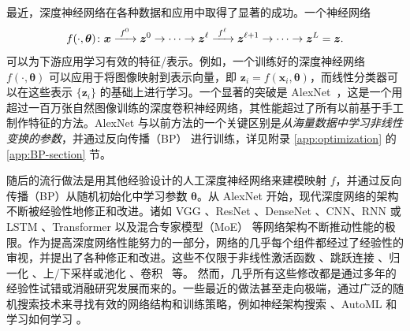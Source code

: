 \documentclass[../../book-main.tex]{subfiles}
\begin{document}
最近，深度神经网络在各种数据和应用中取得了显著的成功。一个神经网络
\begin{equation}
  f(\cdot, \bm \theta) \colon \bm{x}
  \xrightarrow{\hspace{1mm} f^0 \hspace{1mm}} \bm{z}^0 \rightarrow \cdots
  \rightarrow \bm{z}^\ell \xrightarrow{\hspace{1mm} f^\ell \hspace{1mm}}
  \bm{z}^{\ell+1} \rightarrow  \cdots \to \bm{z}^L = \bm{z}.
\end{equation}
可以为下游应用学习有效的特征/表示。例如，一个训练好的深度神经网络 $f(\cdot, \bm \theta)$ 可以应用于将图像映射到表示向量，即 $\bm{z}_i = f(\bm{x}_i,\bm \theta)$，而线性分类器可以在这些表示 $\{\bm{z}_i\}$ 的基础上进行学习。一个显著的突破是 AlexNet~\cite{krizhevsky2012imagenet}，这是一个用超过一百万张自然图像训练的深度卷积神经网络，其性能超过了所有以前基于手工制作特征的方法。AlexNet 与以前方法的一个关键区别是\textit{从海量数据中学习非线性变换的参数}，并通过反向传播（BP）\cite{Back-Prop} 进行训练，详见附录 \ref{app:optimization} 的 \ref{app:BP-section} 节。



随后的流行做法是用其他经验设计的人工深度神经网络来建模映射 $f$，并通过反向传播（BP）从随机初始化中学习参数 $\bm \theta$。从 AlexNet \cite{krizhevsky2012imagenet} 开始，现代深度网络的架构不断被经验性地修正和改进。诸如 VGG \cite{simonyan2014very}、ResNet \cite{he2016deep}、DenseNet \cite{dense-net}、CNN、RNN 或 LSTM \cite{LSTM}、Transformer \cite{vaswani2017attention} 以及混合专家模型（MoE）\cite{MoE,Fedus-2022} 等网络架构不断推动性能的极限。作为提高深度网络性能努力的一部分，网络的几乎每个组件都经过了经验性的审视，并提出了各种修正和改进。这些不仅限于非线性激活函数 \cite{maas2013rectifier,klambauer2017self,xu2015empirical,nwankpa2018activation}、跳跃连接 \cite{ronneberger2015u,he2016deep}、归一化 \cite{ioffe2015batch,ba2016layer,ulyanov2016instance,wu2018group,miyato2018spectral}、上/下采样或池化 \cite{scherer2010evaluation}、卷积~\cite{lecun1998gradient,krizhevsky2012imagenet} 等。
然而，几乎所有这些修改都是通过多年的经验性{试错}或消融研究发展而来的。一些最近的做法甚至走向极端，通过广泛的随机搜索技术来寻找有效的网络结构和训练策略，例如神经架构搜索 \cite{NAS-1,Baker2017DesigningNN}、AutoML \cite{automl} 和学习如何学习 \cite{andrychowicz2016learning}。
\end{document}
